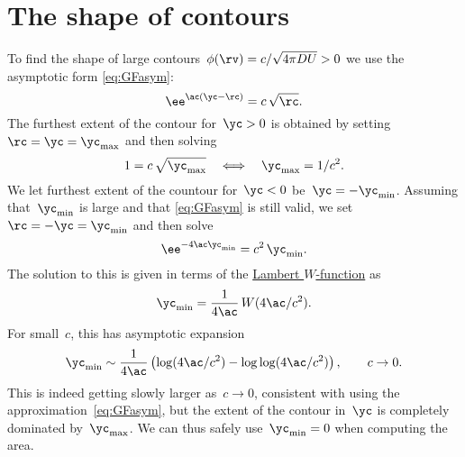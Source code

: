 \documentclass[notitlepage,12pt]{article}
\newcommand{\mathnotation}[2]{\newcommand{#1}{\ensuremath{#2}}}
\renewcommand{\l}{\left}
\renewcommand{\r}{\right}
\begin{document}
\section{The shape of contours}

\mathnotation{\cc}{c}
\mathnotation{\ycmin}{\yc_{\mathrm{min}}}
\mathnotation{\ycmax}{\yc_{\mathrm{max}}}

To find the shape of large contours~$\phi(\rv)=\cc/\sqrt{4\pi D U} > 0$ we use
the asymptotic form \cref{eq:GFasym}:
\begin{equation}
  \ee^{\ac(\yc - \rc)} = \cc\,\sqrt{\rc}.
  \label{eq:contourasym}
\end{equation}
The furthest extent of the contour for~$\yc > 0$ is obtained by
setting~$\rc = \yc = \ycmax$ and then solving
\begin{equation}
  1 = \cc\,\sqrt{\ycmax}
  \quad\Longleftrightarrow\quad
  \ycmax = 1/\cc^2.
\end{equation}
We let furthest extent of the countour for~$\yc<0$ be~$\yc=-\yc_{\text{min}}$.
Assuming that~$\yc_{\text{min}}$ is large and that \cref{eq:GFasym} is still
valid, we set~$\rc = -\yc = \ycmin$ and then solve
\begin{equation}
  \ee^{-4\ac\ycmin} = \cc^2\,\ycmin.
\end{equation}
The solution to this is given in terms of the
\href{http://mathworld.wolfram.com/LambertW-Function.html}{Lambert
  $W$-function} as
\begin{equation}
  \ycmin = \frac{1}{4\ac}\,W(4\ac/\cc^2).
\end{equation}
For small~$\cc$, this has asymptotic expansion
\begin{equation}
  \ycmin \sim \frac{1}{4\ac}
  \l(
  \log(4\ac/\cc^2) - \log\log(4\ac/\cc^2)
  \r),
  \qquad
  \cc \rightarrow 0.
\end{equation}
This is indeed getting slowly larger as~$\cc\rightarrow0$, consistent with
using the approximation~\cref{eq:GFasym}, but the extent of the contour
in~$\yc$ is completely dominated by~$\ycmax$.  We can thus safely
use~$\ycmin=0$ when computing the area.
\end{document}
